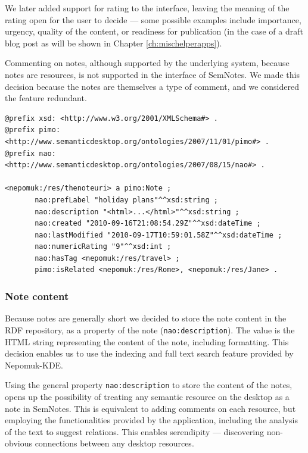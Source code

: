 We later added support for rating to the interface, leaving the meaning of the rating open for the user to decide --- some possible examples include importance, urgency, quality of the content, or readiness for publication (in the case of a draft blog post as will be shown in Chapter \ref{ch:mischelperapps}).

Commenting on notes, although supported by the underlying system, because notes are resources, is not supported in the interface of SemNotes. We made this decision because the notes are themselves a type of comment, and we considered the feature redundant. 

\setlength\parindent{0in}
\begin{minipage}[t]{\linewidth}
\begin{lstlisting}
@prefix xsd: <http://www.w3.org/2001/XMLSchema#> .
@prefix pimo: <http://www.semanticdesktop.org/ontologies/2007/11/01/pimo#> .
@prefix nao: <http://www.semanticdesktop.org/ontologies/2007/08/15/nao#> .

<nepomuk:/res/thenoteuri> a pimo:Note ;
       nao:prefLabel "holiday plans"^^xsd:string ;
       nao:description "<html>...</html>"^^xsd:string ;
       nao:created "2010-09-16T21:08:54.29Z"^^xsd:dateTime ;
       nao:lastModified "2010-09-17T10:59:01.58Z"^^xsd:dateTime ;
       nao:numericRating "9"^^xsd:int ;
       nao:hasTag <nepomuk:/res/travel> ;
       pimo:isRelated <nepomuk:/res/Rome>, <nepomuk:/res/Jane> .
\end{lstlisting}
\end{minipage}
\setlength\parindent{0.21in}

\subsubsection{Note content}

Because notes are generally short \cite{Bernstein2008} we decided to store the note content in the RDF repository, as a property of the note (\verb|nao:description|). The value is the HTML string representing the content of the note, including formatting. This decision enables us to use the indexing and full text search feature provided by Nepomuk-KDE. 

Using the general property \verb|nao:description| to store the content of the notes, opens up the possibility of treating any semantic resource on the desktop as a note in SemNotes. This is equivalent to adding comments on each resource, but employing the functionalities provided by the application, including the analysis of the text to suggest relations. This enables serendipity --- discovering non-obvious connections between any desktop resources.

